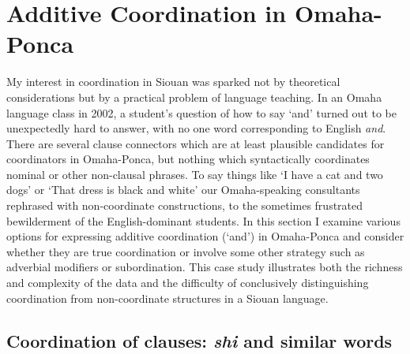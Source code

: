 \documentclass[output=paper]{LSP/langsci}
\begin{document}
\section{Additive Coordination in Omaha-Ponca}\label{sec:rudin:3}

My interest in coordination in Siouan was sparked not by theoretical considerations but by a practical problem of language teaching. In an Omaha language class in 2002, a student's question of how to say `and' turned out to be unexpectedly hard to answer, with no one word corresponding to English \textit{and}. There are several clause connectors which are at least plausible candidates for coordinators in Omaha-Ponca, but nothing which syntactically coordinates nominal or other non-clausal phrases. To say things like `I have a cat and two dogs' or `That dress is black and white' our Omaha-speaking consultants rephrased with non-coordinate constructions, to the sometimes frustrated bewilderment of the English-dominant students.  In this section I examine various options for expressing additive coordination (`and') in Omaha-Ponca and consider whether they are true coordination or involve some other strategy such as adverbial modifiers or subordination. This case study illustrates both the richness and complexity of the data and the difficulty of conclusively distinguishing coordination from non-coordinate structures in a Siouan language.

\subsection{Coordination of clauses: \textit{shi}  and similar words}  
\end{document}
